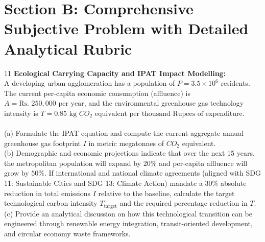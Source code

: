 \section{Section B: Comprehensive Subjective Problem with Detailed Analytical Rubric}

\begin{subjectiveq}{1}{1}
\textbf{Ecological Carrying Capacity and IPAT Impact Modelling:}\\A developing urban agglomeration has a population of $P = 3.5 \times 10^6$ residents. The current per-capita economic consumption (affluence) is $A = \text{Rs.~} 250{,}000\text{ per year}$, and the environmental greenhouse gas technology intensity is $T = 0.85\text{ kg } CO_2\text{ equivalent per thousand Rupees of expenditure}$.\\\\(a) Formulate the IPAT equation and compute the current aggregate annual greenhouse gas footprint $I$ in metric megatonnes of $CO_2$ equivalent.\\(b) Demographic and economic projections indicate that over the next 15 years, the metropolitan population will expand by $20\%$ and per-capita affluence will grow by $50\%$. If international and national climate agreements (aligned with SDG 11: Sustainable Cities and SDG 13: Climate Action) mandate a $30\%$ absolute reduction in total emissions $I$ relative to the baseline, calculate the target technological carbon intensity $T_{\text{target}}$ and the required percentage reduction in $T$.\\(c) Provide an analytical discussion on how this technological transition can be engineered through renewable energy integration, transit-oriented development, and circular economy waste frameworks.
\end{subjectiveq}

